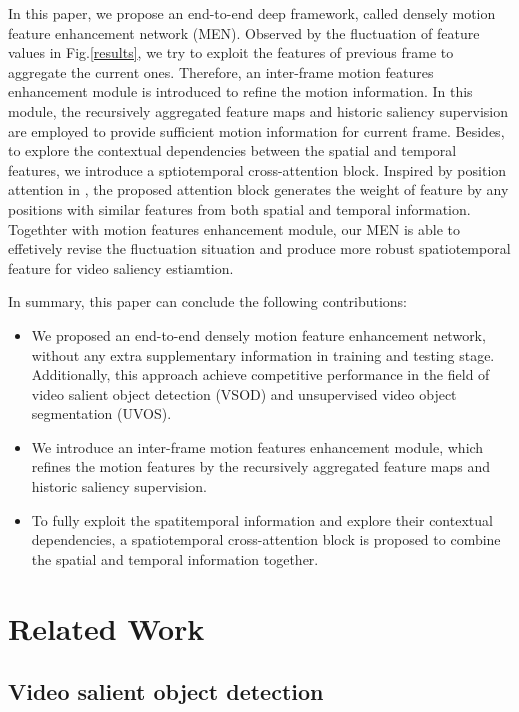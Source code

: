 \documentclass[12pt]{article}
\begin{document}
In this paper, we propose an end-to-end deep framework, called densely motion feature enhancement network (MEN). Observed by the fluctuation of feature values in Fig.\ref{results}, we try to exploit the features of previous frame to aggregate the current ones. Therefore, an inter-frame motion features enhancement module is introduced to refine the motion information. In this module, the recursively aggregated feature maps and historic saliency supervision are employed to provide sufficient motion information for current frame. Besides, to explore the contextual dependencies between the spatial and temporal features, we introduce a sptiotemporal cross-attention block. Inspired by position attention in \cite{}, the proposed attention block generates the weight of feature by any positions with similar features from both spatial and temporal information. Togethter with motion features enhancement module, our MEN is able to effetively revise the fluctuation situation and produce more robust spatiotemporal feature for video saliency estiamtion.

In summary, this paper can conclude the following contributions:

\begin{itemize}
  \item We proposed an end-to-end densely motion feature enhancement network, without any extra supplementary information in training and testing stage. Additionally, this approach achieve competitive performance in the field of video salient object detection (VSOD) and unsupervised video object segmentation (UVOS). 
  \item We introduce an inter-frame motion features enhancement module, which refines the motion features by the recursively aggregated feature maps and historic saliency supervision.
  \item To fully exploit the spatitemporal information and explore their contextual dependencies, a spatiotemporal cross-attention block is proposed to combine the spatial and temporal information together.	  
\end{itemize}
 

\section{Related Work}
\subsection{Video salient object detection}
\end{document}
